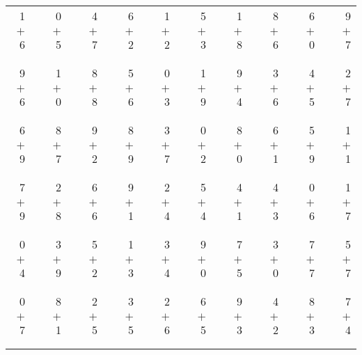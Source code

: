 \documentclass[12pt, letterpaper]{article}
\begin{document}
\begin{tabular}{rrrrrrrrrrrrrrrrrrr}
1 & & 0 & & 4 & & 6 & & 1 & & 5 & & 1 & & 8 & & 6 & & 9\\
$+$ 6 & & $+$ 5 & & $+$ 7 & & $+$ 2 & & $+$ 2 & & $+$ 3 & & $+$ 8 & & $+$ 6 & & $+$ 0 & & $+$ 7\\
\cline{1-1} \cline{3-3} \cline{5-5} \cline{7-7} \cline{9-9} \cline{11-11} \cline{13-13} \cline{15-15} \cline{17-17} \cline{19-19} \\ \\
9 & & 1 & & 8 & & 5 & & 0 & & 1 & & 9 & & 3 & & 4 & & 2\\
$+$ 6 & & $+$ 0 & & $+$ 8 & & $+$ 6 & & $+$ 3 & & $+$ 9 & & $+$ 4 & & $+$ 6 & & $+$ 5 & & $+$ 7\\
\cline{1-1} \cline{3-3} \cline{5-5} \cline{7-7} \cline{9-9} \cline{11-11} \cline{13-13} \cline{15-15} \cline{17-17} \cline{19-19} \\ \\
6 & & 8 & & 9 & & 8 & & 3 & & 0 & & 8 & & 6 & & 5 & & 1\\
$+$ 9 & & $+$ 7 & & $+$ 2 & & $+$ 9 & & $+$ 7 & & $+$ 2 & & $+$ 0 & & $+$ 1 & & $+$ 9 & & $+$ 1\\
\cline{1-1} \cline{3-3} \cline{5-5} \cline{7-7} \cline{9-9} \cline{11-11} \cline{13-13} \cline{15-15} \cline{17-17} \cline{19-19} \\ \\
7 & & 2 & & 6 & & 9 & & 2 & & 5 & & 4 & & 4 & & 0 & & 1\\
$+$ 9 & & $+$ 8 & & $+$ 6 & & $+$ 1 & & $+$ 4 & & $+$ 4 & & $+$ 1 & & $+$ 3 & & $+$ 6 & & $+$ 7\\
\cline{1-1} \cline{3-3} \cline{5-5} \cline{7-7} \cline{9-9} \cline{11-11} \cline{13-13} \cline{15-15} \cline{17-17} \cline{19-19} \\ \\
0 & & 3 & & 5 & & 1 & & 3 & & 9 & & 7 & & 3 & & 7 & & 5\\
$+$ 4 & & $+$ 9 & & $+$ 2 & & $+$ 3 & & $+$ 4 & & $+$ 0 & & $+$ 5 & & $+$ 0 & & $+$ 7 & & $+$ 7\\
\cline{1-1} \cline{3-3} \cline{5-5} \cline{7-7} \cline{9-9} \cline{11-11} \cline{13-13} \cline{15-15} \cline{17-17} \cline{19-19} \\ \\
0 & & 8 & & 2 & & 3 & & 2 & & 6 & & 9 & & 4 & & 8 & & 7\\
$+$ 7 & & $+$ 1 & & $+$ 5 & & $+$ 5 & & $+$ 6 & & $+$ 5 & & $+$ 3 & & $+$ 2 & & $+$ 3 & & $+$ 4\\
\cline{1-1} \cline{3-3} \cline{5-5} \cline{7-7} \cline{9-9} \cline{11-11} \cline{13-13} \cline{15-15} \cline{17-17} \cline{19-19} \\ \\

\end{tabular}
\end{document}
